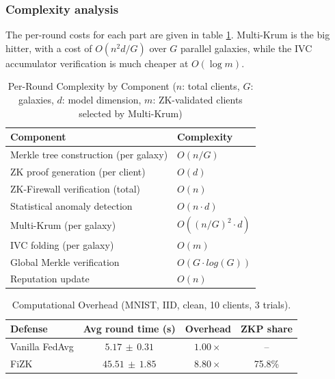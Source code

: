 \documentclass[10pt,twocolumn,letterpaper]{article}
\begin{document}
\subsubsection{Complexity analysis}

The per-round costs for each part are given in table \cref{tab:complexity}. Multi-Krum is the big hitter, with a cost of $O(n^2 d/G)$ over $G$ parallel galaxies, while the IVC accumulator verification is much cheaper at $O(\log m)$.


\begin{table}[t]
  \centering
  \small
  \caption{Per-Round Complexity by Component ($n$: total clients, $G$: galaxies, $d$: model dimension, $m$: ZK-validated clients selected by Multi-Krum)}
  \label{tab:complexity}
  \begin{tabular}{@{}ll@{}}
    \toprule
    \textbf{Component} & \textbf{Complexity} \\
    \midrule
    Merkle tree construction (per galaxy) & $O(n/G)$ \\
    ZK proof generation (per client)      & $O(d)$ \\
    ZK-Firewall verification (total)      & $O(n)$ \\
    Statistical anomaly detection         & $O(n \cdot d)$ \\
    Multi-Krum (per galaxy)               & $O((n/G)^2 \cdot d)$ \\
    IVC folding (per galaxy)              & $O(m)$ \\
    Global Merkle verification            & $O(G\cdot log(G))$ \\
    Reputation update                     & $O(n)$ \\
    \bottomrule
  \end{tabular}
\end{table}



\begin{table}[t]
  \centering
  \small
  \caption{Computational Overhead (MNIST, IID, clean, 10 clients, 3 trials).}
  \label{tab:overhead}
  \begin{tabular}{@{}lccc@{}}
    \toprule
    \textbf{Defense} & \textbf{Avg round time (s)} & \textbf{Overhead} & \textbf{ZKP share} \\
    \midrule
    Vanilla FedAvg & $5.17\,\pm\,0.31$ & $1.00\times$ & -- \\
    FiZK           & $45.51\,\pm\,1.85$ & $8.80\times$ & 75.8\% \\
    \bottomrule
  \end{tabular}
\end{table}
\end{document}
